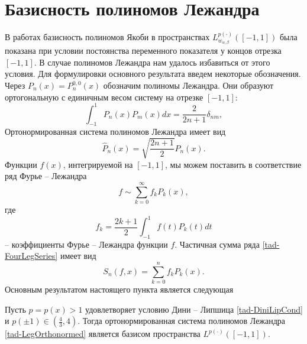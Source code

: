 \section{Базисность полиномов Лежандра}
В работах \cite{tad-SHII-Leg,tad-SHII-Jacob,tad-SHII-Ult,tad-RAM-Jacob} базисность полиномов Якоби в пространствах $L^{p(\cdot)}_{w_{\alpha,\beta}}([-1,1])$ была показана при условии постоянства переменного показателя у концов отрезка $[-1,1]$. В случае полиномов Лежандра нам удалось избавиться от этого условия. Для формулировки основного результата введем некоторые обозначения. Через $P_n(x)=P^{0,0}_n(x)$ обозначим полиномы Лежандра.
Они образуют ортогональную с единичным весом систему на отрезке $[-1,1]$:
\begin{equation*}
  \int_{-1}^1P_n(x)P_m(x)dx=\frac{2}{2n+1}\delta_{nm},
\end{equation*}
Ортонормированная система полиномов Лежандра имеет вид
\begin{equation}\label{tad-LegOrthonormed}
  \hat{P}_n(x)=\sqrt{\frac{2n+1}{2}}P_n(x).
\end{equation}
Функции $f(x)$, интегрируемой на $[-1,1]$, мы можем поставить в соответствие ряд Фурье -- Лежандра
\begin{equation}\label{tad-FourLegSeries}
  f\sim\sum_{k=0}^\infty f_kP_k(x),
\end{equation}
где
\begin{equation*}
  f_k=\frac{2k+1}{2}\int_{-1}^1f(t)P_k(t)dt
\end{equation*}
-- коэффициенты Фурье -- Лежандра функции $f$. Частичная сумма ряда \eqref{tad-FourLegSeries} имеет вид
\begin{equation*}
  S_n(f,x)=\sum_{k=0}^n f_kP_k(x).
\end{equation*}
Основным результатом настоящего пункта является следующая
\begin{theorem}
	Пусть $p=p(x)>1$ удовлетворяет условию Дини -- Липшица \eqref{tad-DiniLipCond} и $p(\pm1)\in(\frac43,4)$. Тогда ортонормированная система полиномов Лежандра \eqref{tad-LegOrthonormed} является базисом пространства $L^{p(\cdot)}([-1,1])$.
\end{theorem}


